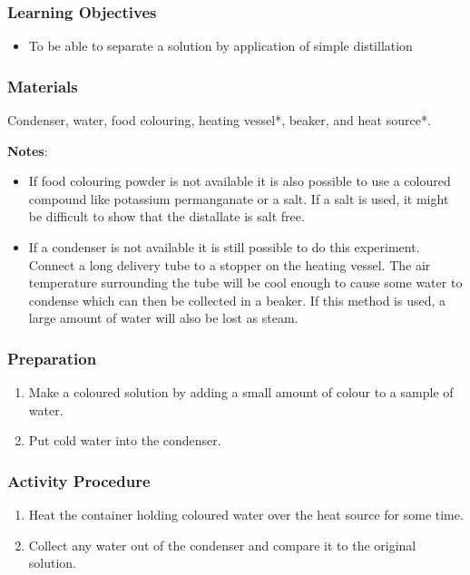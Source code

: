 \subsubsection*{Learning Objectives}
\begin{itemize}
\item{To be able to separate a solution by application of simple distillation}
\end{itemize}

\subsubsection*{Materials}
Condenser, water, food colouring, heating vessel*, beaker, and heat source*.

\textbf{Notes}:

\begin{itemize}
\item{If food colouring powder is not available it is also possible to use a coloured compound like potassium permanganate or a salt. If a salt is used, it might be difficult to show that the distallate is salt free.}
\item{If a condenser is not available it is still possible to do this experiment. Connect a long delivery tube to a stopper on the heating vessel. The air temperature surrounding the tube will be cool enough to cause some water to condense which can then be collected in a beaker. If this method is used, a large amount of water will also be lost as steam.}
\end{itemize}

\subsubsection*{Preparation}
\begin{enumerate}
\item{Make a coloured solution by adding a small amount of colour to a sample of water.}
\item{Put cold water into the condenser.}
\end{enumerate}

\subsubsection*{Activity Procedure}
\begin{enumerate}
\item{Heat the container holding coloured water over the heat source for some time.}
\item{Collect any water out of the condenser and compare it to the original solution.}
\end{enumerate}

